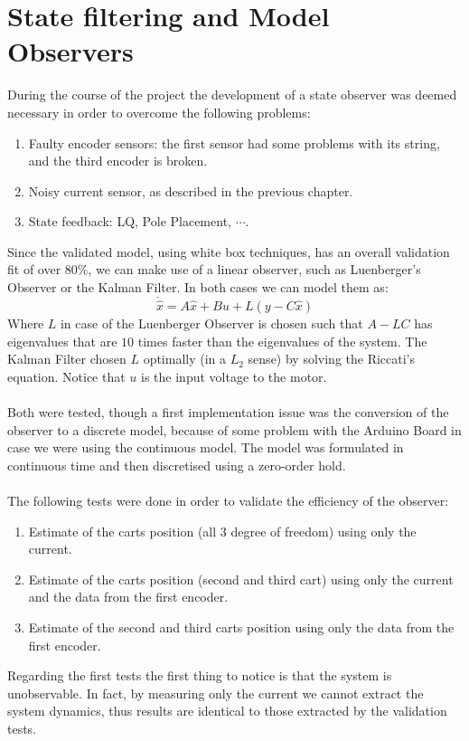 \chapter{State filtering and Model Observers}
During the course of the project the development of a state observer was deemed necessary in order to overcome the following problems:
\begin{enumerate}
\item Faulty encoder sensors: the first sensor had some problems with  its string, and the third encoder is broken.
\item Noisy current sensor, as described in the previous chapter.
\item State feedback: LQ, Pole Placement, $\cdots$.
\end{enumerate}
Since the validated model, using white box techniques, has an overall validation fit of over $80\%$, we can make use of a linear observer, such as Luenberger's Observer or the Kalman Filter. In both cases we can model them as:
\begin{equation}
\dot{\hat{x}} = A \hat{x}+Bu + L(y-C\hat{x})
\end{equation}
Where $L$ in case of the Luenberger Observer is chosen such that $A-LC$ has eigenvalues that are $10$ times faster than the eigenvalues of the system. The Kalman Filter chosen $L$ optimally (in a $L_2$ sense) by solving the Riccati's equation. Notice that $u$ is the input voltage to the motor.\\\\
Both were tested, though a first implementation issue was the conversion of the observer to a discrete model, because of some problem with the Arduino Board in case we were using the continuous model. The model was formulated in continuous time and then discretised using a zero-order hold.\\ \\
The following tests were done in order to validate the efficiency of the observer:
\begin{enumerate}
\item Estimate of the carts position (all 3 degree of freedom) using only the current.
\item Estimate of the carts position (second and third cart) using only the current and the data from the first encoder.
\item Estimate of the second and third carts position using only the data from the first encoder. 
\end{enumerate}
Regarding the first tests the first thing to notice is that the system is unobservable. In fact, by measuring only the current we cannot extract the system dynamics, thus results are identical to those extracted by the validation tests. \\ \\
